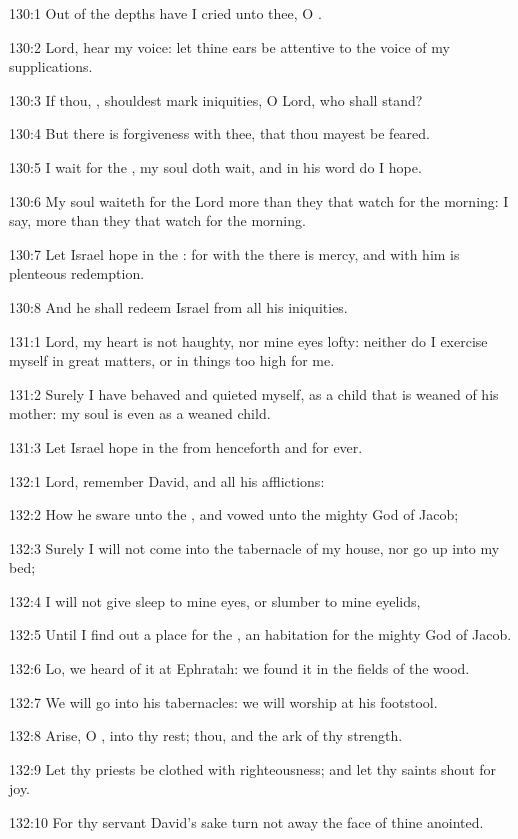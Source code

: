 130:1 Out of the depths have I cried unto thee, O \LORD.

130:2 Lord, hear my voice: let thine ears be attentive to the voice of my supplications.

130:3 If thou, \LORD, shouldest mark iniquities, O Lord, who shall stand?

130:4 But there is forgiveness with thee, that thou mayest be feared.

130:5 I wait for the \LORD, my soul doth wait, and in his word do I hope.

130:6 My soul waiteth for the Lord more than they that watch for the morning: I say, more than they that watch for the morning.

130:7 Let Israel hope in the \LORD: for with the \LORD there is mercy, and with him is plenteous redemption.

130:8 And he shall redeem Israel from all his iniquities.



131:1 Lord, my heart is not haughty, nor mine eyes lofty: neither do I exercise myself in great matters, or in things too high for me.

131:2 Surely I have behaved and quieted myself, as a child that is weaned of his mother: my soul is even as a weaned child.

131:3 Let Israel hope in the \LORD from henceforth and for ever.



132:1 Lord, remember David, and all his afflictions:

132:2 How he sware unto the \LORD, and vowed unto the mighty God of Jacob;

132:3 Surely I will not come into the tabernacle of my house, nor go up into my bed;

132:4 I will not give sleep to mine eyes, or slumber to mine eyelids,

132:5 Until I find out a place for the \LORD, an habitation for the mighty God of Jacob.

132:6 Lo, we heard of it at Ephratah: we found it in the fields of the wood.

132:7 We will go into his tabernacles: we will worship at his footstool.

132:8 Arise, O \LORD, into thy rest; thou, and the ark of thy strength.

132:9 Let thy priests be clothed with righteousness; and let thy saints shout for joy.

132:10 For thy servant David's sake turn not away the face of thine anointed.

